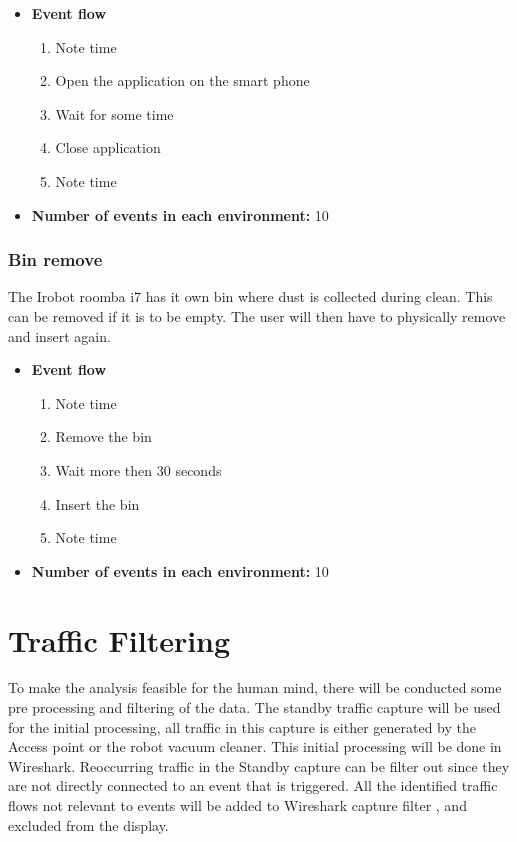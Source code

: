 \begin{itemize}
    \item \textbf{Event flow} \begin{enumerate}
                                    \item Note time
                                    \item Open the application on the smart phone
                                    \item Wait for some time
                                    \item Close application
                                    \item Note time
                                \end{enumerate}
    \item \textbf{Number of events in each environment:} 10
\end{itemize}

\subsubsection{Bin remove}
The Irobot roomba i7 has it own bin where dust is collected during clean. This can be removed if it is to be empty. The user will then have to physically remove and insert again. 

\begin{itemize}
    \item \textbf{Event flow} \begin{enumerate}
                                    \item Note time
                                    \item Remove the bin
                                    \item Wait  more then 30 seconds
                                    \item Insert the bin
                                    \item Note time
                                \end{enumerate}
    \item \textbf{Number of events in each environment:} 10
\end{itemize}

\section{Traffic Filtering}
To make the analysis feasible for the human mind, there will be conducted some pre processing and filtering of the data. The standby traffic capture will be used for the initial processing, all traffic in this capture is either generated by the Access point or the robot vacuum cleaner. This initial processing will be done in Wireshark. Reoccurring traffic in the Standby capture can be filter out since they are not directly connected to an event that is triggered. All the identified traffic flows not relevant to events will be added to Wireshark capture filter \cite{wireshark}, and excluded from the display.

